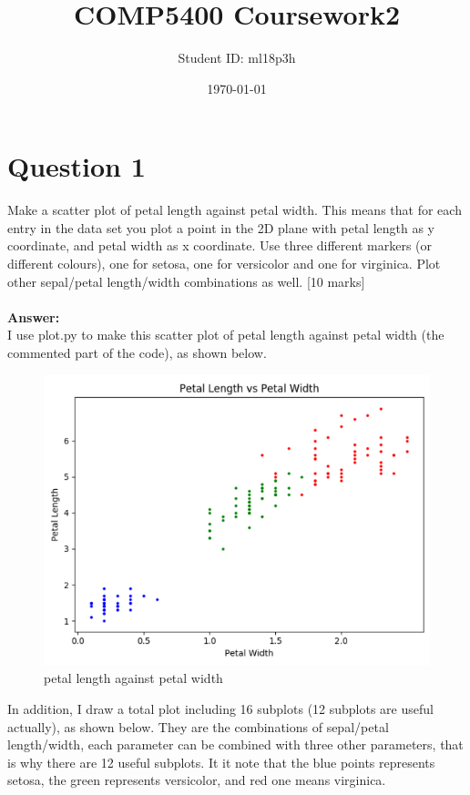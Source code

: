 \documentclass{article}
\title{COMP5400 Coursework2}
\author{Student ID: ml18p3h}
\date{\today}
\begin{document}
\maketitle

\section{Question 1}
Make a scatter plot of petal length against petal width. This means that for each entry in the data set you plot a point in the 2D plane with petal length as y coordinate, and petal width as x coordinate. Use three different markers (or different colours), one for setosa, one for versicolor and one for virginica. Plot other sepal/petal length/width combinations as well.
[10 marks]\\\\
\textbf{Answer:}\\
I use plot.py to make this scatter plot of petal length against petal width (the commented part of the code), as shown below.
\begin{figure}[H]
\centering
\includegraphics[scale=0.4]{./img/scatter.png}
\caption{petal length against petal width}
\end{figure}
\noindent
In addition, I draw a total plot including 16 subplots (12 subplots are useful actually), as shown below. They are the combinations of sepal/petal length/width, each parameter can be combined with three other parameters, that is why there are 12 useful subplots. It it note that the blue points represents setosa, the green represents versicolor, and red one means virginica.
\end{document}
